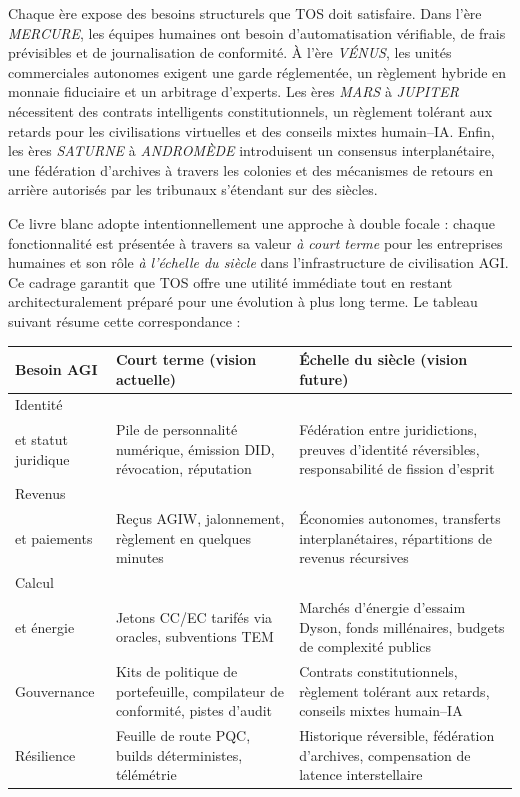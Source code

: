 \documentclass[11pt]{article}
\begin{document}
Chaque ère expose des besoins structurels que TOS doit satisfaire. Dans l'ère \emph{MERCURE}, les équipes humaines ont besoin d'automatisation vérifiable, de frais prévisibles et de journalisation de conformité. À l'ère \emph{VÉNUS}, les unités commerciales autonomes exigent une garde réglementée, un règlement hybride en monnaie fiduciaire et un arbitrage d'experts. Les ères \emph{MARS} à \emph{JUPITER} nécessitent des contrats intelligents constitutionnels, un règlement tolérant aux retards pour les civilisations virtuelles et des conseils mixtes humain--IA. Enfin, les ères \emph{SATURNE} à \emph{ANDROMÈDE} introduisent un consensus interplanétaire, une fédération d'archives à travers les colonies et des mécanismes de retours en arrière autorisés par les tribunaux s'étendant sur des siècles.

Ce livre blanc adopte intentionnellement une approche à double focale : chaque fonctionnalité est présentée à travers sa valeur \emph{à court terme} pour les entreprises humaines et son rôle \emph{à l'échelle du siècle} dans l'infrastructure de civilisation AGI. Ce cadrage garantit que TOS offre une utilité immédiate tout en restant architecturalement préparé pour une évolution à plus long terme. Le tableau suivant résume cette correspondance :

\begin{longtable}{@{}p{}p{}p{}@{}}
\toprule
\textbf{Besoin AGI} & \textbf{Court terme (vision actuelle)} & \textbf{Échelle du siècle (vision future)} \\\midrule
Identité \\ et statut juridique & Pile de personnalité numérique, émission DID, révocation, réputation & Fédération entre juridictions, preuves d'identité réversibles, responsabilité de fission d'esprit \\
Revenus \\ et paiements & Reçus AGIW, jalonnement, règlement en quelques minutes & Économies autonomes, transferts interplanétaires, répartitions de revenus récursives \\
Calcul \\ et énergie & Jetons CC/EC tarifés via oracles, subventions TEM & Marchés d'énergie d'essaim Dyson, fonds millénaires, budgets de complexité publics \\
Gouvernance & Kits de politique de portefeuille, compilateur de conformité, pistes d'audit & Contrats constitutionnels, règlement tolérant aux retards, conseils mixtes humain--IA \\
Résilience & Feuille de route PQC, builds déterministes, télémétrie & Historique réversible, fédération d'archives, compensation de latence interstellaire \\\bottomrule
\end{longtable}
\end{document}
